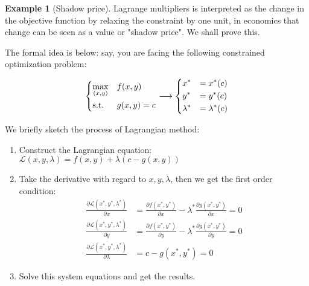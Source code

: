 \documentclass[12pt, a4paper]{article}
\theoremstyle{definition}
\newtheorem{example}{Example}
\begin{document}
\begin{example}[Shadow price]
Lagrange multipliers is interpreted as the change in the objective function by relaxing the constraint by one unit, in economics that change can be seen as a value or "shadow price". We shall prove this. 
    
The formal idea is below: say, you are facing the following constrained optimization problem:

\[
\begin{dcases}
\max_{(x,y)} &{}f(x,y) \\
\textrm{s.t.} &{}g(x,y)=c
\end{dcases}\longrightarrow
\begin{dcases}
x^{*} &= x^{*}(c)\\
y^{*} &= y^{*}(c)\\
\lambda^{*} &= \lambda^{*}(c)
\end{dcases}
\]

We briefly sketch the process of Lagrangian method:
\begin{enumerate}
\item Construct the Lagrangian equation: $\mathcal{L}(x,y,\lambda) = f(x,y)+\lambda(c-g(x,y))$
\item Take the derivative with regard to $x,y,\lambda$, then we get the first order condition:
\begin{align*}
\frac{\partial \mathcal{L}(x^{*},y^{*},\lambda^{*})}{\partial x}&=\frac{\partial f(x^{*},y^{*})}{\partial x}-\lambda^{*}\frac{\partial g(x^{*},y^{*})}{\partial x}=0\\
\frac{\partial \mathcal{L}(x^{*},y^{*},\lambda^{*})}{\partial y}&=\frac{\partial f(x^{*},y^{*})}{\partial y}-\lambda^{*}\frac{\partial g(x^{*},y^{*})}{\partial y}=0\\
\frac{\partial \mathcal{L}(x^{*},y^{*},\lambda^{*})}{\partial \lambda}&=c-g(x^{*},y^{*})=0
\end{align*}
\item Solve this system equations and get the results.
\end{enumerate}


\end{example}
\end{document}
